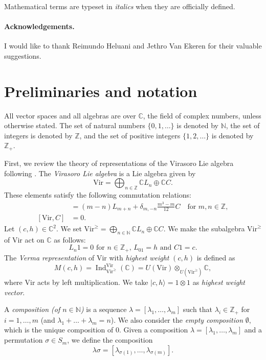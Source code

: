 \documentclass[a4paper, 12pt, reqno]{amsart}
\theoremstyle{remark}
\DeclareMathOperator{\Ind}{Ind}
\newcommand{\Vir}{{\mathrm{Vir}}}
\begin{document}
Mathematical terms are typeset in \emph{italics} when they are officially defined.

\paragraph{Acknowledgements.}
I would like to thank Reimundo Heluani and Jethro Van Ekeren for their valuable suggestions.

\section{Preliminaries and notation}
\label{sec:prel-notat}

All vector spaces and all algebras are over $\mathbb{C}$, the field of complex numbers, unless otherwise stated.
The set of natural numbers $\{0, 1, \dots\}$ is denoted by $\mathbb{N}$, the set of integers is denoted by $\mathbb{Z}$, and the set of positive integers $\{1, 2, \dots\}$ is denoted by $\mathbb{Z}_+$.

First, we review the theory of representations of the Virasoro Lie algebra following \cite[\S3]{kac_bombay_2013}.
The \emph{Virasoro Lie algebra} is a Lie algebra given by
\begin{equation*}
  \Vir = \bigoplus_{n \in \mathbb{Z}}\mathbb{C}L_n \oplus \mathbb{C}C.
\end{equation*}
These elements satisfy the following commutation relations:
\begin{align*}
  [L_m, L_n] &= (m - n)L_{m + n} + \delta_{m, -n}\frac{m^3 - m}{12}C \quad \text{for $m, n \in \mathbb{Z}$}, \\
  [\Vir, C] &= 0.
\end{align*}
Let $(c, h) \in \mathbb{C}^2$.
We set $\Vir^\ge = \bigoplus_{n \in \mathbb{N}}\mathbb{C}L_n \oplus \mathbb{C}C$.
We make the subalgebra $\Vir^\ge$ of $\Vir$ act on $\mathbb{C}$ as follows:
\begin{equation*}
  \text{$L_n1 = 0$ for $n \in \mathbb{Z}_+$, $L_01 = h$ and $C1 = c$}.
\end{equation*}
The \emph{Verma representation} of $\Vir$ with \emph{highest weight} $(c, h)$ is defined as
\begin{equation*}
  M(c, h) = \Ind^\Vir_{\Vir^\ge}(\mathbb{C}) = U(\Vir) \otimes_{U(\Vir^\ge)} \mathbb{C},
\end{equation*}
where $\Vir$ acts by left multiplication.
We take $|c, h\rangle = 1\otimes1$ as \emph{highest weight vector}.

A \emph{composition (of $n \in \mathbb{N}$)} is a sequence $\lambda = [\lambda_1, \dots, \lambda_m]$ such that $\lambda_i \in \mathbb{Z}_+$ for $i = 1, \dots, m$ (and $\lambda_1 + \dots + \lambda_m = n$).
We also consider the \emph{empty composition} $\emptyset$, which is the unique composition of $0$.
Given a composition $\lambda = [\lambda_1, \dots, \lambda_m]$ and a permutation $\sigma \in S_m$, we define the composition
\begin{equation*}
  \lambda\sigma = [\lambda_{\sigma(1)}, \dots, \lambda_{\sigma(m)}].
\end{equation*}
\end{document}
